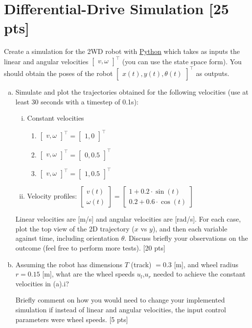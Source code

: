 \section{Differential-Drive Simulation [25 pts]}
Create a simulation for the 2WD robot with \underline{Python} which takes as inputs the linear and angular velocities $\begin{bmatrix}
    v,\omega
\end{bmatrix}^\top$ (you can use the state space form). You should obtain the poses of the robot $\begin{bmatrix}
    x(t),y(t),\theta(t)
\end{bmatrix}^\top$ as outputs. 
\begin{enumerate}[(a)]
    \item Simulate and plot the trajectories obtained for the following velocities (use at least 30 seconds with a timestep of 0.1s):
    \begin{enumerate}[i.]
        \item Constant velocities
        \begin{enumerate} [1.]
            \item $\begin{bmatrix}
    v,\omega
\end{bmatrix}^\top=\begin{bmatrix}
    1,0
\end{bmatrix}^\top$
\item $\begin{bmatrix}
    v,\omega
\end{bmatrix}^\top=\begin{bmatrix}
    0,0.5
\end{bmatrix}^\top$
\item $\begin{bmatrix}
    v,\omega
\end{bmatrix}^\top=\begin{bmatrix}
    1,0.5
\end{bmatrix}^\top$
        \end{enumerate}
        \item Velocity profiles: $\begin{bmatrix}
            v(t)\\\omega(t)
        \end{bmatrix}=\begin{bmatrix}
            1+0.2\cdot\sin(t)\\
            0.2+0.6\cdot\cos(t)
        \end{bmatrix}$
    \end{enumerate}
    Linear velocities are [m/s] and angular velocities are [rad/s]. For each case, plot the top view of the 2D trajectory ($x$ vs $y$), and then each variable against time, including orientation $\theta$. Discuss briefly your observations on the outcome (feel free to perform more tests). [20 pts]
    \item 	Assuming the robot has dimensions $T$ (track) $= 0.3$ [m], and wheel radius $r = 0.15$ [m], what are the wheel speeds $u_l$,$u_r$ needed to achieve the constant velocities in (a).i? 
    
    Briefly comment on how you would need to change your implemented simulation if instead of linear and angular velocities, the input control parameters were wheel speeds. [5 pts]


\end{enumerate}